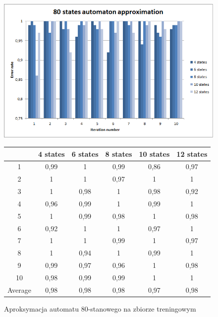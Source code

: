 \documentclass[runningheads,a4paper]{llncs}
\begin{document}
\begin{figure}[!htb]
\includegraphics[scale=0.92]{10.png}
\endminipage\hfill
\hspace{2.2cm}
\renewcommand{\arraystretch}{1.3}%
\begin{tabular}{@{}cccccc@{}}
\toprule
        & 4 states & 6 states & 8 states & 10 states & 12 states    \\ \midrule
1       & 0,99     & 1        & 0,99     & 0,86      & 0,97 \\
2       & 1        & 1        & 0,97     & 1         & 1 \\
3       & 1        & 0,98     & 1        & 0,98      & 0,92 \\
4       & 0,96     & 0,99     & 1        & 0,99      & 1   \\
5       & 1        & 0,99     & 0,98     & 1         & 0,98   \\
6       & 0,92     & 1        & 1        & 0,97      & 1    \\
7       & 1        & 1        & 0,99     & 1         & 0,97    \\
8       & 1        & 0,94     & 1        & 0,99      & 1    \\
9       & 0,99     & 0,97     & 0,96     & 1         & 0,98 \\
10      & 0,98     & 0,99     & 0,99     & 1         & 1  \\ \bottomrule
Average & 0,98    & 0,98    & 0,98    & 0,97     & 0,98  \\ \bottomrule
\end{tabular}
\vspace{4mm}
\endminipage\hfill
\caption{Aproksymacja automatu 80-stanowego na zbiorze treningowym}
\end{figure}
\end{document}
